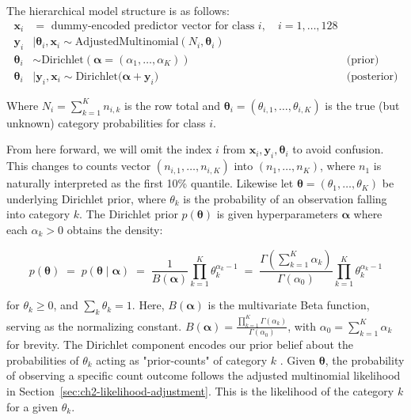 The hierarchical model structure is as follows: 
\begin{align*}
    \mathbf{x}_i &=\text{ dummy-encoded predictor vector for class } i, \quad i = 1,\dots,128 \\
    \mathbf{y}_i &\mid \boldsymbol{\theta}_i, \mathbf{x}_i \sim \mathrm{AdjustedMultinomial}\left(N_i, \boldsymbol{\theta}_i\right)\\
    \boldsymbol{\theta}_i  &\sim \mathrm{Dirichlet}\left(\boldsymbol{\alpha}= (\alpha_1, \dots, \alpha_K)\right) \quad  & \text{(prior)}\\
    \boldsymbol{\theta}_i &\mid \mathbf{y}_i, \mathbf{x}_i \sim \mathrm{Dirichlet}\bigl(\boldsymbol{\alpha} + \mathbf{y}_i \bigr) \quad & \text{(posterior)}
\end{align*}

Where \(N_i = \sum_{k=1}^{K}n_{i,k}\) is the row total and \(\boldsymbol{\theta}_i = (\theta_{i,1},\dots,\theta_{i,K})\) is the true (but unknown) category probabilities for class \(i\). 

From here forward, we will omit the index \(i\) from \(\mathbf{x}_i, \mathbf{y}_i,\boldsymbol{\theta}_i\) to avoid confusion. This changes to counts vector \((n_{i,1}, \dots, n_{i,K})\) into \((n_{1}, \dots, n_{K})\), where \(n_1\) is naturally interpreted as the first 10\% quantile. Likewise let \(\boldsymbol{\theta} = (\theta_1, \dots, \theta_K)\) be underlying Dirichlet prior, where \(\theta_k\) is the probability of an observation falling into category \(k\). The Dirichlet prior \(p(\boldsymbol{\theta})\) is given hyperparameters \(\boldsymbol{\alpha}\) where each \(\alpha_k > 0\) obtains the density:

\[
    p(\boldsymbol{\theta})
    \;=\;
   p(\boldsymbol{\theta} \mid \boldsymbol{\alpha})
    \;=\;
        \frac{1}{B(\boldsymbol{\alpha})} 
    \prod_{k=1}^K \theta_k^{\alpha_k -1}
    \;=\;
    \frac{\Gamma(\sum_{k=1}^K \alpha_k)}{\Gamma(\alpha_0)} 
    \prod_{k=1}^K \theta_k^{\alpha_k -1}
\]

for \(\theta_k \ge 0\), and \(\sum_k \theta_k = 1\). Here, \(B(\boldsymbol{\alpha})\) is the multivariate Beta function, serving as the normalizing constant. \(B(\boldsymbol{\alpha}) = \frac{\prod_{k=1}^K \Gamma(\alpha_k)}{\Gamma(\alpha_0)}\), with \(\alpha_0 = \sum_{k=1}^K \alpha_k\) for brevity. The Dirichlet component encodes our prior belief about the probabilities of \(\theta_k\) acting as "prior-counts" of category \(k\) \parencite{wiki:dirichlet-multinomial}. Given \(\boldsymbol{\theta}\), the probability of observing a specific count outcome follows the adjusted multinomial likelihood in Section~\ref{sec:ch2-likelihood-adjustment}. This is the likelihood of the category \(k\) for a given \(\theta_k\).

